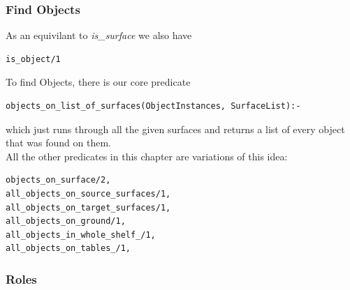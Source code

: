 \documentclass[main.tex]{subfiles}
\begin{document}
\subsubsection{Find Objects}
As an equivilant to \textit{is\_surface} we also have
\begin{lstlisting}
is_object/1
\end{lstlisting}
To find Objects, there is our core predicate
\begin{lstlisting}
objects_on_list_of_surfaces(ObjectInstances, SurfaceList):-
\end{lstlisting}
which just runs through all the given surfaces and returns a list of every object that was found on them.\\
All the other predicates in this chapter are variations of this idea:
\begin{lstlisting}
objects_on_surface/2,
all_objects_on_source_surfaces/1,
all_objects_on_target_surfaces/1,
all_objects_on_ground/1,
all_objects_in_whole_shelf_/1,
all_objects_on_tables_/1,
\end{lstlisting}

\subsubsection{Roles}
\end{document}
